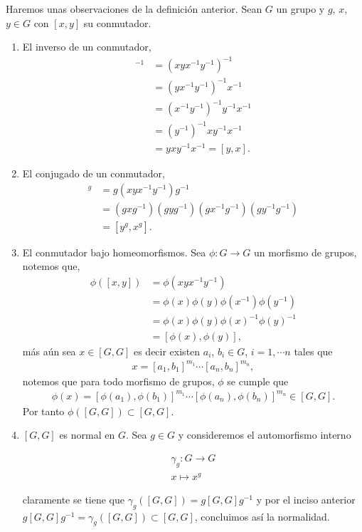 \begin{ob}\label{ob:pr_de_los_conmutadores}
Haremos unas observaciones de la definición anterior. Sean $G$ un grupo y $g$, $x$, $y \in G$ con $[x,y]$ su conmutador.

\begin{enumerate}
	\item El inverso de un conmutador,
	\begin{align*}
	[x,y]^{-1} & =(xyx^{-1}y^{-1})^{-1} \\
	& = (yx^{-1}y^{-1})^{-1}x^{-1} \\
	& = (x^{-1}y^{-1})^{-1}y^{-1}x^{-1} \\
	& = (y^{-1})^{-1}xy^{-1}x^{-1} \\
	& = yxy^{-1}x^{-1} = [y,x] .
	\end{align*}
	
	\item El conjugado de un conmutador, 
	\begin{align*}
	[x,y]^{g} & = g(xyx^{-1}y^{-1})g^{-1} \\
	& = (gxg^{-1})(gyg^{-1})(gx^{-1}g^{-1})(gy^{-1}g^{-1}) \\
	& =  [y^{g},x^{g}].
	\end{align*}
	
	\item El conmutador bajo homeomorfismos. Sea $\phi:G \to G$ un morfismo de grupos, notemos que,
	\begin{align*}
	\phi([x,y]) & = \phi(xyx^{-1}y^{-1})\\
	& = \phi(x)\phi(y)\phi(x^{-1})\phi(y^{-1}) \\
	& = \phi(x)\phi(y)\phi(x)^{-1}\phi(y)^{-1} \\
	& =  [\phi(x),\phi(y)],     
	\end{align*}
	más aún sea $x \in [G,G]$ es decir existen $a_i$, $b_i \in G$, $i=1, \cdots n$ tales que
	\begin{align*}
	x=[a_1,b_1]^{m_1} \cdots[a_n,b_n]^{m_n},
	\end{align*}
	notemos que para todo morfismo de grupos, $\phi$ se cumple que
	\begin{align*}
	\phi(x)=[\phi(a_1),\phi(b_1)]^{m_1} \cdots[\phi(a_n),\phi(b_n)]^{m_n} \in [G,G].
	\end{align*}
	 Por tanto $\phi([G,G]) \subset [G,G]$.
	\item $[G,G]$ es normal en $G$. Sea $g \in G$ y consideremos el automorfismo interno 
	
	\begin{align*}
	\gamma_g:G \to G \\
	x \mapsto x^{g}
	\end{align*}	 
	
	claramente se tiene que $\gamma_g([G,G])=g[G,G]g^{-1}$ y por el inciso anterior $g[G,G]g^{-1}=\gamma_g([G,G]) \subset [G,G]$, concluimos así la normalidad.
\end{enumerate}
\end{ob}

